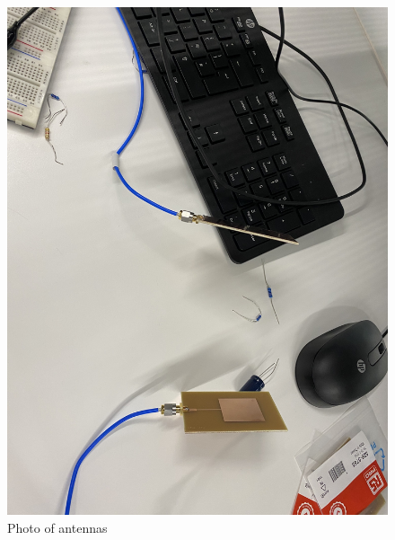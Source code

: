 \documentclass[12pt,a4paper]{report}
\begin{document}
\begin{figure}[ht]
    \centerline{\includegraphics[scale=0.1]{Antennas}}
    \caption{Photo of antennas}
    \label{fig:antennas}
\end{figure}
\end{document}
